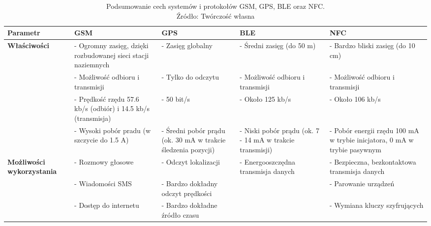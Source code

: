 \begin{table}[H]
\centering
\caption{Podsumowanie cech systemów i protokołów GSM, GPS, BLE oraz NFC.\\ Źródło: Twórczość własna}
\label{table:table_nmea_messages}
\begin{tabular}{| p{2.5cm} | p{3.5cm} | p{3cm} | p{3cm} | p{3.5cm} |}
\hline
\textbf{Parametr} &  \textbf{GSM} & \textbf{GPS}	& \textbf{BLE} & \textbf{NFC} \\ \hline	
\textbf{Właściwości} & - Ogromny zasięg, dzięki rozbudowanej sieci stacji naziemnych & - Zasięg globalny & - Średni zasięg (do 50 m) & - Bardzo bliski zasięg (do 10 cm) \\
			& - Możliwość odbioru i transmisji & - Tylko do odczytu & - Możliwość odbioru i transmisji & - Możliwość odbioru i transmisji \\
			& - Prędkość rzędu 57.6 kb/s (odbiór) i 14.5 kb/s (transmisja) & - 50 bit/s & - Około 125 kb/s & - Około 106 kb/s \\
			& - Wysoki pobór pradu (w szczycie do 1.5 A) & - Średni pobór prądu (ok. 30 mA w trakcie śledzenia pozycji) & - Niski pobór prądu (ok. 7 - 14 mA w trakcie transmisji) & - Pobór energii rzędu 100 mA w trybie inicjatora, 0 mA w trybie pasywnym \\ \hline
\textbf{Możliwości wykorzystania} & - Rozmowy głosowe & - Odczyt lokalizacji & - Energooszczędna transmisja danych & - Bezpieczna, bezkontaktowa transmisja danych \\
						& - Wiadomości SMS & - Bardzo dokładny odczyt prędkości & & - Parowanie urządzeń \\
						& - Dostęp do internetu & - Bardzo dokładne źródło czasu & & - Wymiana kluczy szyfrujących \\ \hline
\end{tabular}
\end{table}

